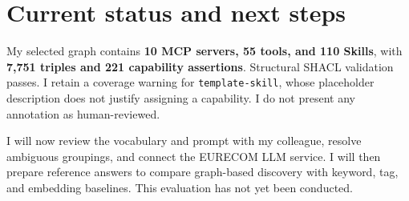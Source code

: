 \documentclass[11pt,a4paper]{article}
\begin{document}
\section*{Current status and next steps}
My selected graph contains \textbf{10 MCP servers, 55 tools, and 110 Skills}, with \textbf{7,751 triples and 221 capability assertions}. Structural SHACL validation passes. I retain a coverage warning for \texttt{template-skill}, whose placeholder description does not justify assigning a capability. I do not present any annotation as human-reviewed.

I will now review the vocabulary and prompt with my colleague, resolve ambiguous groupings, and connect the EURECOM LLM service. I will then prepare reference answers to compare graph-based discovery with keyword, tag, and embedding baselines. This evaluation has not yet been conducted.
\end{document}
